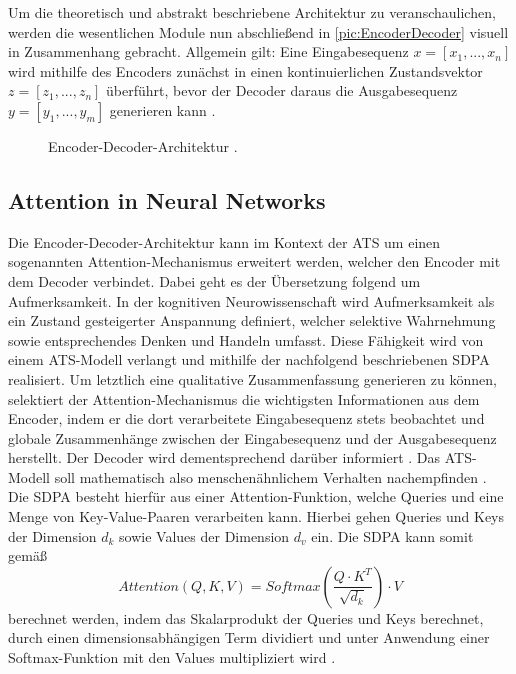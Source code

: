 \noindent
Um die theoretisch und abstrakt beschriebene Architektur zu veranschaulichen, werden die wesentlichen Module nun abschließend in \autoref{pic:EncoderDecoder} visuell in Zusammenhang gebracht. Allgemein gilt: Eine Eingabesequenz $x = [x_{1}, ..., x_{n}]$ wird mithilfe des Encoders zunächst in einen kontinuierlichen Zustandsvektor $z = [z_{1}, ..., z_{n}]$ überführt, bevor der Decoder daraus die Ausgabesequenz $y = [y_{1}, ..., y_{m}]$ generieren kann \cite[S.~2]{VAS17}.\\

\begin{figure}[h!]
  \centering
  \caption{Encoder-Decoder-Architektur \cite[S.~375]{ZHA20}.}
  \label{pic:EncoderDecoder}
\end{figure}
\newpage


\subsection{Attention in Neural Networks}
\noindent
Die Encoder-Decoder-Architektur kann im Kontext der \ac{ATS} um einen sogenannten Attention-Mechanismus erweitert werden, welcher den Encoder mit dem Decoder verbindet. Dabei geht es der Übersetzung folgend um Aufmerksamkeit. In der kognitiven Neurowissenschaft wird Aufmerksamkeit als ein Zustand gesteigerter Anspannung definiert, welcher selektive Wahrnehmung sowie entsprechendes Denken und Handeln umfasst. Diese Fähigkeit wird von einem \ac{ATS}-Modell verlangt und mithilfe der nachfolgend beschriebenen \ac{SDPA} realisiert. Um letztlich eine qualitative Zusammenfassung generieren zu können, selektiert der Attention-Mechanismus die wichtigsten Informationen aus dem Encoder, indem er die dort verarbeitete Eingabesequenz stets beobachtet und globale Zusammenhänge zwischen der Eingabesequenz und der Ausgabesequenz herstellt. Der Decoder wird dementsprechend darüber informiert \cite[S.~1]{VAS17}. Das \ac{ATS}-Modell soll mathematisch also menschenähnlichem Verhalten nachempfinden \cite[S.~389]{ZHA20}.\\

\noindent
Die \ac{SDPA} besteht hierfür aus einer Attention-Funktion, welche Queries und eine Menge von Key-Value-Paaren verarbeiten kann. Hierbei gehen Queries und Keys der Dimension $d_k$ sowie Values der Dimension $d_v$ ein. Die \ac{SDPA} kann somit gemäß $$Attention(Q, K, V) = Softmax(\frac{Q \cdot K^T}{\sqrt{d_k}}) \cdot V$$ berechnet werden, indem das Skalarprodukt der Queries und Keys berechnet, durch einen dimensionsabhängigen Term dividiert und unter Anwendung einer Softmax-Funktion mit den Values multipliziert wird \cite[S.~4]{VAS17}.\\

